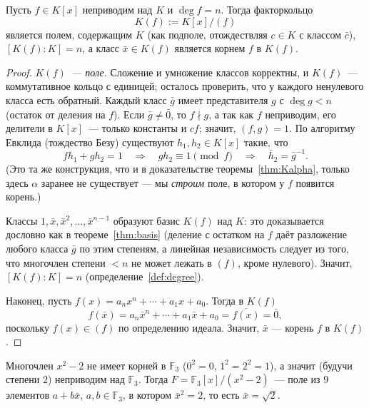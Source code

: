 \documentclass[12pt]{article}
\begin{document}
    \begin{theorem}\label{thm:root-field}
    	Пусть $f \in K[x]$ неприводим над $K$ и $\deg f = n$. Тогда факторкольцо
    	\[
    	K(f) := K[x]/(f)
    	\]
    	является полем, содержащим $K$ (как подполе, отождествляя $c \in K$ с классом $\bar c$), $[K(f):K] = n$, а класс $\bar x \in K(f)$ является корнем $f$ в $K(f)$.
    \end{theorem}
    \begin{proof}
    	\emph{$K(f)$~--- поле.} Сложение и умножение классов корректны, и $K(f)$~--- коммутативное кольцо с единицей; осталось проверить, что у каждого ненулевого класса есть обратный. Каждый класс $\bar g$ имеет представителя $g$ с $\deg g < n$ (остаток от деления на $f$). Если $\bar g \ne \bar 0$, то $f \nmid g$, а так как $f$ неприводим, его делители в $K[x]$~--- только константы и $c f$; значит, $(f, g) = 1$. По алгоритму Евклида (тождество Безу) существуют $h_1, h_2 \in K[x]$ такие, что
    	\[
    	f h_1 + g h_2 = 1 \quad \Longrightarrow \quad g h_2 \equiv 1 \pmod f \quad \Longrightarrow \quad \bar h_2 = \bar g^{-1}.
    	\]
    	(Это та же конструкция, что и в доказательстве теоремы~\ref{thm:Kalpha}, только здесь $\alpha$ заранее не существует --- мы \emph{строим} поле, в котором у $f$ появится корень.)

    	Классы $1, \bar x, \bar x^2, \ldots, \bar x^{n-1}$ образуют базис $K(f)$ над $K$: это доказывается дословно как в теореме~\ref{thm:basis} (деление с остатком на $f$ даёт разложение любого класса $\bar g$ по этим степеням, а линейная независимость следует из того, что многочлен степени $<n$ не может лежать в $(f)$, кроме нулевого). Значит, $[K(f):K]=n$ (определение~\ref{def:degree}).

    	Наконец, пусть $f(x) = a_n x^n + \cdots + a_1 x + a_0$. Тогда в $K(f)$
    	\[
    	f(\bar x) = a_n \bar x^n + \cdots + a_1 \bar x + a_0 = \overline{f(x)} = \bar 0,
    	\]
    	поскольку $f(x) \in (f)$ по определению идеала. Значит, $\bar x$ --- корень $f$ в $K(f)$.
    \end{proof}

    \begin{example}
    	Многочлен $x^2 - 2$ не имеет корней в $\mathbb{F}_3$ ($0^2 = 0$, $1^2 = 2^2 = 1$), а значит (будучи степени $2$) неприводим над $\mathbb{F}_3$. Тогда $F = \mathbb{F}_3[x]/(x^2 - 2)$~--- поле из $9$ элементов $a + b\bar x$, $a, b \in \mathbb{F}_3$, в котором $\bar x^2 = 2$, то есть $\bar x = \sqrt 2$.
    \end{example}
    
\end{document}
